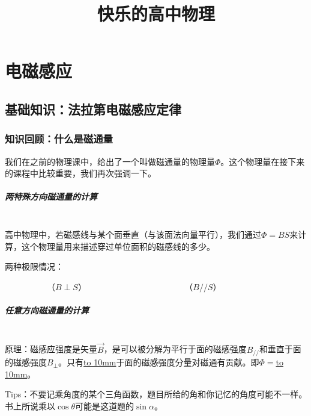 \documentclass{ctexbook}
\title{快乐的高中物理}
\begin{document}
	\chapter{电磁感应}
	\section{基础知识：法拉第电磁感应定律}
	\subsection{知识回顾：什么是磁通量}
	我们在之前的物理课中，给出了一个叫做磁通量的物理量$\varPhi$。这个物理量在接下来的课程中比较重要，我们再次强调一下。
	
	\paragraph{两特殊方向磁通量的计算}~{}
	\\
	\indent
	高中物理中，若磁感线与某个面垂直（与该面法向量平行），我们通过$\varPhi=BS$来计算，这个物理量用来描述穿过单位面积的磁感线的多少。
	
	两种极限情况：
	
	\hspace*{\fill}
	
	\hspace*{\fill}
	
	\hspace*{\fill}
	
	\hspace*{\fill}
	
	\hspace*{\fill}
		
		\,\,\,\,\,\,\,\,\,\,\,\,\,\,\,\,\,\,\,\,\,\,\,\,\,\,\,\,\,\,（$B\perp S$）\,\,\,\,\,\,\,\,\,\,\,\,\,\,\,\,\,\,\,\,\,\,\,\,\,\,\,\,\,\,\,\,\,\,\,\,\,\,\,\,\,\,\,\,\,\,\,\,\,\,\,\,\,\,\,\,\,\,\,\,\,\,\,\,\,\,\,\,\,\,（$B//S$）
	
	\paragraph{任意方向磁通量的计算}~{}
	\\
	\indent
	原理：磁感应强度是矢量$\vec{B}$，是可以被分解为平行于面的磁感强度$B_{//}$和垂直于面的磁感强度$B_{\perp}$。只有\underline{\hbox to 10mm{}}于面的磁感强度分量对磁通有贡献。即$\varPhi =$\underline{\hbox to 10mm{}}。
	
	Tips：不要记乘角度的某个三角函数，题目所给的角和你记忆的角度可能不一样。书上所说乘以$\cos \theta$可能是这道题的$\sin \alpha$。
	
\end{document}
